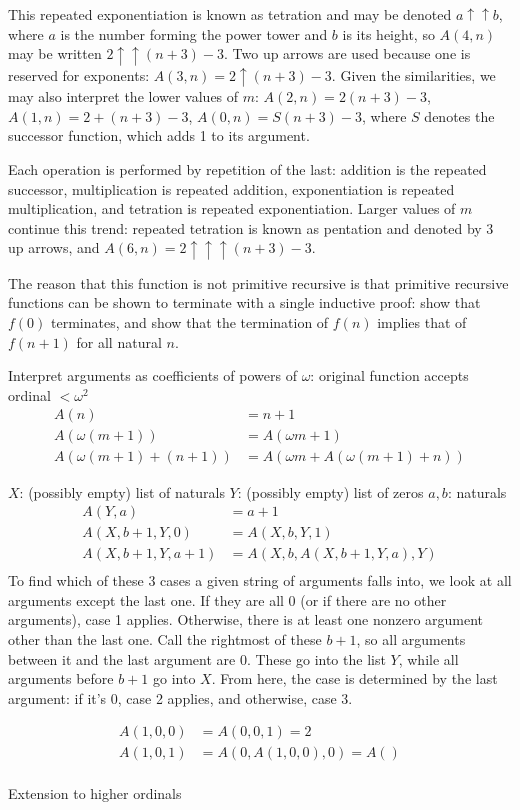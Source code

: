 \documentclass{article}
\begin{document}
This repeated exponentiation is known as tetration
and may be denoted $a \uparrow \uparrow b$,
where $a$ is the number forming the power tower
and $b$ is its height,
so $A(4, n)$ may be written $2\uparrow\uparrow(n+3)-3$.
Two up arrows are used because one is reserved for exponents:
$A(3, n) = 2\uparrow(n+3)-3$.
Given the similarities,
we may also interpret the lower values of $m$:
$A(2, n) = 2(n+3)-3$, $A(1, n) = 2+(n+3)-3$, $A(0, n) = S(n+3)-3$,
where $S$ denotes the successor function,
which adds 1 to its argument.

Each operation is performed by repetition of the last:
addition is the repeated successor,
multiplication is repeated addition,
exponentiation is repeated multiplication,
and tetration is repeated exponentiation.
Larger values of $m$ continue this trend:
repeated tetration is known as pentation and denoted by 3 up arrows,
and $A(6, n) = 2\uparrow\uparrow\uparrow(n+3)-3$.

The reason that this function is not primitive recursive
is that primitive recursive functions can be shown to terminate with a single inductive proof:
show that $f(0)$ terminates,
and show that the termination of $f(n)$ implies that of $f(n+1)$ for all natural $n$.

Interpret arguments as coefficients of powers of $\omega$:
original function accepts ordinal $<\omega^2$
\begin{align*}
  A(n) &= n+1 \\
  A(\omega(m+1)) &= A(\omega m+1) \\
  A(\omega(m+1)+(n+1)) &= A(\omega m+A(\omega(m+1)+n))
\end{align*}

$X$: (possibly empty) list of naturals
$Y$: (possibly empty) list of zeros
$a, b$: naturals
\begin{align*}
  A(Y, a) &= a+1 \\
  A(X, b+1, Y, 0) &= A(X, b, Y, 1) \\
  A(X, b+1, Y, a+1) &= A(X, b, A(X, b+1, Y, a), Y) \\
\end{align*}
To find which of these 3 cases a given string of arguments falls into,
we look at all arguments except the last one.
If they are all 0 (or if there are no other arguments), case 1 applies.
Otherwise, there is at least one nonzero argument other than the last one.
Call the rightmost of these $b+1$,
so all arguments between it and the last argument are 0.
These go into the list $Y$,
while all arguments before $b+1$ go into $X$.
From here, the case is determined by the last argument:
if it's 0, case 2 applies,
and otherwise, case 3.

\begin{align*}
  A(1, 0, 0) &= A(0, 0, 1) = 2 \\
  A(1, 0, 1) &= A(0, A(1, 0, 0), 0) = A() \\
\end{align*}

Extension to higher ordinals

\end{document}
